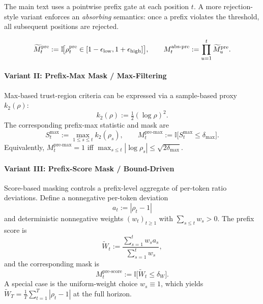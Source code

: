 The main text uses a pointwise prefix gate at each position $t$. A more rejection-style variant enforces an \emph{absorbing} semantics:
once a prefix violates the threshold, all subsequent positions are rejected.

\begin{equation*}
    \widetilde{M}_t^{\mathrm{pre}}
    := \mathbb{I}\!\big[\rho_{t}^{\mathrm{pre}} \in [1-\epsilon_{\mathrm{low}},1+\epsilon_{\mathrm{high}}]\big],
    \qquad
    M_t^{\mathrm{abs\text{-}pre}}
    := \prod_{u=1}^{t}\widetilde{M}_u^{\mathrm{pre}}.
\end{equation*}

\paragraph{Variant II: Prefix-Max Mask / Max-Filtering}

Max-based trust-region criteria can be expressed via a sample-based proxy $k_2(\rho)$:
\begin{equation*}
    k_2(\rho) := \tfrac{1}{2}(\log\rho)^2.
\end{equation*}
The corresponding prefix-max statistic and mask are
\begin{equation*}
    S_t^{\max} := \max_{1\le s\le t} k_2(\rho_s),
    \qquad
    M_t^{\mathrm{pre\text{-}max}} := \mathbb{I}\!\big[S_t^{\max} \le \delta_{\max}\big].
\end{equation*}
Equivalently, $M_t^{\mathrm{pre\text{-}max}}=1$ iff $\max_{s\le t}|\log\rho_s| \le \sqrt{2\delta_{\max}}$.

\paragraph{Variant III: Prefix-Score Mask / Bound-Driven}

Score-based masking controls a prefix-level aggregate of per-token ratio deviations. Define a nonnegative per-token deviation
\begin{equation*}
    a_t := |\rho_t - 1|
\end{equation*}
and deterministic nonnegative weights $(w_t)_{t\ge1}$ with $\sum_{s\le t} w_s > 0$. The prefix score is
\begin{equation*}
    \widetilde{W}_t
    := \frac{\sum_{s=1}^{t} w_s a_s}{\sum_{s=1}^{t} w_s},
\end{equation*}
and the corresponding mask is
\begin{equation*}
    M_t^{\mathrm{pre\text{-}score}} := \mathbb{I}\!\big[\widetilde{W}_t \le \delta_W\big].
\end{equation*}
A special case is the uniform-weight choice $w_s\equiv 1$, which yields $\widetilde{W}_T = \frac{1}{T}\sum_{t=1}^{T}|\rho_t-1|$ at the
full horizon.

